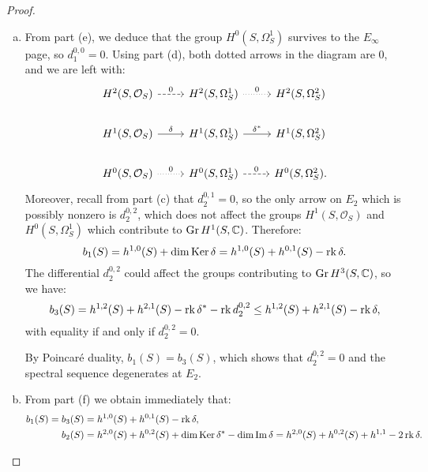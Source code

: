 \documentclass{article}
\begin{document}
\begin{proof}
\begin{enumerate}[(a)]
\item From part (e), we deduce that the group $H^0(S,\Omega^1_S)$ survives to the $E_{\infty}$ page, so
$d_1^{0,0} = 0$. Using part (d), both dotted arrows in the diagram are 0, and we are left with:
\[
\begin{tikzcd}
H^2(S,\mathcal{O}_S)\arrow[dashed]{r}{0} & H^2(S,\Omega^1_S)\arrow[dotted]{r}{0} & H^2(S,\Omega^2_S) \\
H^1(S,\mathcal{O}_S)\arrow{r}{\delta} & H^1(S,\Omega^1_S)\arrow{r}{\delta^*} & H^1(S,\Omega^2_S) \\
H^0(S,\mathcal{O}_S)\arrow[dotted]{r}{0} & H^0(S,\Omega^1_S)\arrow[dashed]{r}{0} & H^0(S,\Omega^2_S).
\end{tikzcd}
\]
Moreover, recall from part (c) that $d_2^{0,1} = 0$, so the only arrow on $E_2$ which is possibly nonzero
is $d_2^{0,2}$, which does not affect the groups $H^1(S,\mathcal{O}_S)$ and $H^0(S,\Omega^1_S)$ which contribute
to $\operatorname{Gr} H^1(S,\mathbb{C})$. Therefore:
\[	b_1(S) = h^{1,0}(S) + \dim \operatorname{Ker} \delta = h^{1,0}(S) + h^{0,1}(S) - \operatorname{rk} \delta.	\]
The differential $d_2^{0,2}$ could affect the groups contributing to $\operatorname{Gr} H^3(S,\mathbb{C})$, so we have:
\[	b_3(S) = h^{1,2}(S) + h^{2,1}(S) - \operatorname{rk} \delta^* - \operatorname{rk} d_2^{0,2} \leq h^{1,2}(S) + h^{2,1}(S) - \operatorname{rk} \delta ,	\]
with equality if and only if $d_2^{0,2} = 0$.

By Poincar\'e duality, $b_1(S) = b_3(S)$, which shows that $d_2^{0,2} = 0$ and the spectral sequence degenerates
at $E_2$.

\item From part (f) we obtain immediately that:
\begin{align*}
b_1(S) = b_3(S) &= h^{1,0}(S) + h^{0,1}(S) - \operatorname{rk} \delta, \\
b_2(S) &= h^{2,0}(S) + h^{0,2}(S) + \dim \operatorname{Ker} \delta^* - \dim \operatorname{Im} \delta = h^{2,0}(S) + h^{0,2}(S) +
h^{1,1} - 2 \operatorname{rk} \delta.
\end{align*}
\end{enumerate}
\end{proof}
\end{document}
